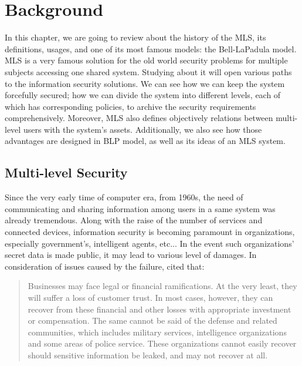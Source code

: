 
\chapter{Background} %

\label{ch:background} %


In this chapter, we are going to review about the history of the MLS, its definitions, usages, and one of its most famous models: the Bell-LaPadula model.
MLS is a very famous solution for the old world security problems for multiple subjects accessing one shared system. 
Studying about it will open various paths to the information security solutions.
We can see how we can keep the system forcefully secured; 
how we can divide the system into different levels, each of which has corresponding policies, to archive the security requirements comprehensively.
Moreover, MLS also defines objectively relations between multi-level users with the system's assets. 
Additionally, we also see how those advantages are designed in BLP model, as well as its ideas of an MLS system.


\section{Multi-level Security}
\label{ch:background:mls}

Since the very early time of computer era, from 1960s, the need of communicating and sharing information among users in a same system was already tremendous.
Along with the raise of the number of services and connected devices, information security is becoming paramount in organizations, especially government's, intelligent agents, etc...
In the event such organizations' secret data is made public, it may lead to various level of damages.
In consideration of issues caused by the failure, \citeauthor{centos:2008} cited that:

\begin{quote}
Businesses may face legal or financial ramifications. At the very least, they will suffer a loss of customer trust. 
In most cases, however, they can recover from these financial and other losses with appropriate investment or compensation. 
The same cannot be said of the defense and related communities, which includes military services, intelligence organizations and some areas of police service.
These organizations cannot easily recover should sensitive information be leaked, and may not recover at all. 
\end{quote}

